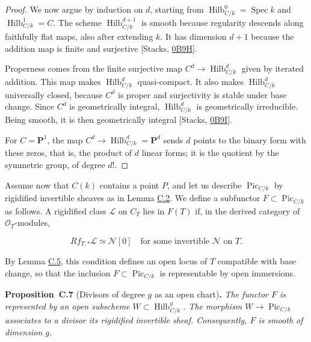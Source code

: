 \documentclass[11pt]{article}
\newenvironment{bpstatement}[2]{\par\addvspace{0.6\baselineskip}\noindent\textbf{#1}#2\textbf{.}\enspace\ignorespaces}
  {\par\addvspace{0.4\baselineskip}}
\newenvironment{bpstatementit}[2]{\begin{bpstatement}{#1}{#2}\itshape\ignorespaces}{\end{bpstatement}}
\begin{document}
\begin{proof}[{Proof}]
We now argue by induction on \(d\), starting from \(\operatorname{Hilb}^{0}_{C/k}=\operatorname{Spec}k\) and \(\operatorname{Hilb}^{1}_{C/k}=C\). The scheme \(\operatorname{Hilb}^{d+1}_{C/k}\) is smooth because regularity descends along faithfully flat maps, also after extending \(k\). It has dimension \(d+1\) because the addition map is finite and surjective [Stacks, \href{https://stacks.math.columbia.edu/tag/0B9H}{0B9H}].

Properness comes from the finite surjective map \(C^d\to \operatorname{Hilb}^{d}_{C/k}\) given by iterated addition. This map makes \(\operatorname{Hilb}^{d}_{C/k}\) quasi-compact. It also makes \(\operatorname{Hilb}^{d}_{C/k}\) universally closed, because \(C^d\) is proper and surjectivity is stable under base change. Since \(C^d\) is geometrically integral, \(\operatorname{Hilb}^{d}_{C/k}\) is geometrically irreducible. Being smooth, it is then geometrically integral [Stacks, \href{https://stacks.math.columbia.edu/tag/0B9I}{0B9I}].

For \(C=\mathbf P^1\), the map \(C^d\to \operatorname{Hilb}^{d}_{C/k}=\mathbf P^d\) sends \(d\) points to the binary form with these zeros, that is, the product of \(d\) linear forms; it is the quotient by the symmetric group, of degree \(d!\).
\end{proof}

\label{bp23}%
Assume now that \(C(k)\) contains a point \(P\), and let us describe \(\operatorname{Pic}_{C/k}\) by rigidified invertible sheaves as in Lemma \hyperref[bp7]{C.2}. We define a subfunctor \(F\subset\operatorname{Pic}_{C/k}\) as follows. A rigidified class \(\mathcal L\) on \(C_T\) lies in \(F(T)\) if, in the derived category of \(\mathcal O_T\)-modules,

\[
Rf_{T,*}\mathcal L\simeq\mathcal N[0]
\quad\text{for some invertible }\mathcal N\text{ on }T.
\]

By Lemma \hyperref[bp17]{C.5}, this condition defines an open locus of \(T\) compatible with base change, so that the inclusion \(F\subset\operatorname{Pic}_{C/k}\) is representable by open immersions.

\label{bp24}%
\begin{bpstatementit}{Proposition~C.7}{ (Divisors of degree $g$ as an open chart)}
The functor \(F\) is represented by an open subscheme \(W\subset \operatorname{Hilb}^{g}_{C/k}\). The morphism \(W\to\operatorname{Pic}_{C/k}\) associates to a divisor its rigidified invertible sheaf. Consequently, \(F\) is smooth of dimension \(g\).
\end{bpstatementit}
\end{document}
